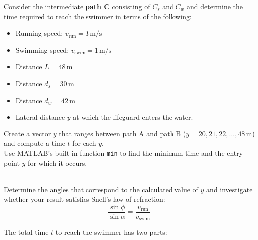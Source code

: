 \documentclass[a4paper, 12pt]{report}
\def\ni{blue!20!white}
\begin{document}
\begin{tcolorbox}[title={\color{black}{\section{Q7}}}, colback=white, colframe=\ni, boxrule=1mm, width=1\textwidth]
         \vspace{0.6em}
             
         Consider the intermediate \textbf{path C} consisting of $C_s$ and $C_w$ and determine the time required to reach the swimmer in terms of the following:\\[1em]
         \begin{minipage}{0.4\textwidth}
         \begin{itemize}[itemsep=-0.1cm]
             \item Running speed: \( v_{\text{run}} = 3 \, \text{m/s} \)
             \item Swimming speed: \( v_{\text{swim}} = 1 \, \text{m/s} \)
             \item Distance \( L = 48 \, \text{m} \)
             \item Distance \( d_s = 30 \, \text{m} \)
             \item Distance \( d_w = 42 \, \text{m} \)
             \item Lateral distance \( y \) at which the lifeguard enters the water.
         \end{itemize}
        \end{minipage}\hfil
        \begin{minipage}{0.52\textwidth}
         Create a vector \( y \) that ranges between path A and path B (\( y = 20, 21, 22, \dots, 48 \, \text{m} \)) and compute a time \( t \) for each \( y \).\\[8pt]
         Use MATLAB's built-in function \texttt{min} to find the minimum time and the entry point \( y \) for which it occurs.
        \end{minipage}\\[1em]
        
         Determine the angles that correspond to the calculated value of \( y \) and investigate 
         whether your result satisfies Snell's law of refraction:
         \[\frac{\sin \phi}{\sin \alpha} = \frac{v_{\text{run}}}{v_{\text{swim}}}\]
    \end{tcolorbox}
    The total time \( t \) to reach the swimmer has two parts:\\[8pt]
    
\end{document}
